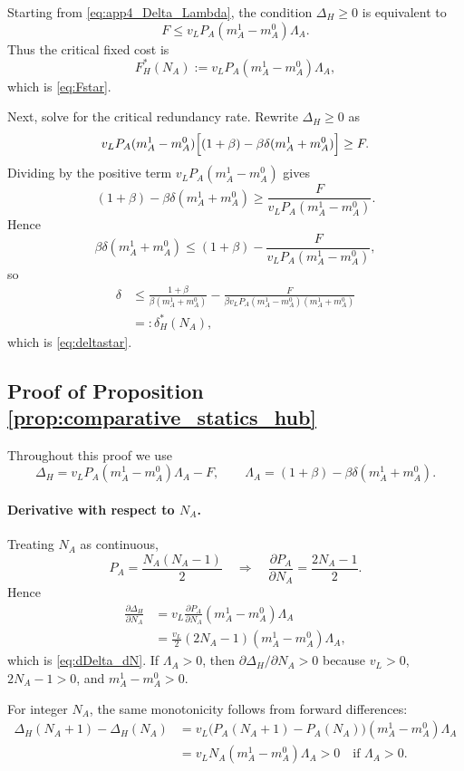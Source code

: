 Starting from \eqref{eq:app4_Delta_Lambda}, the condition $\Delta_H\ge 0$ is equivalent to
\[
F\le v_L P_A(m_A^1-m_A^0)\Lambda_A.
\]
Thus the critical fixed cost is
\begin{equation}
F_H^*(N_A):=v_L P_A(m_A^1-m_A^0)\Lambda_A,
\label{eq:app4_Fstar}
\end{equation}
which is \eqref{eq:Fstar}.

Next, solve for the critical redundancy rate. Rewrite $\Delta_H\ge 0$ as
\[
v_L P_A(m_A^1-m_A^0)\Bigl[(1+\beta)-\beta\delta(m_A^1+m_A^0)\Bigr]\ge F.
\]
Dividing by the positive term $v_L P_A(m_A^1-m_A^0)$ gives
\[
(1+\beta)-\beta\delta(m_A^1+m_A^0)
\ge
\frac{F}{v_L P_A(m_A^1-m_A^0)}.
\]
Hence
\[
\beta\delta(m_A^1+m_A^0)
\le
(1+\beta)-\frac{F}{v_L P_A(m_A^1-m_A^0)},
\]
so
\begin{align}
\delta
&\le
\frac{1+\beta}{\beta(m_A^1+m_A^0)}
-
\frac{F}{\beta v_L P_A(m_A^1-m_A^0)(m_A^1+m_A^0)}
\nonumber\\
&=:\delta_H^*(N_A),
\label{eq:app4_deltastar}
\end{align}
which is \eqref{eq:deltastar}.

\subsection{Proof of Proposition \ref{prop:comparative_statics_hub}}

Throughout this proof we use
\[
\Delta_H=v_L P_A(m_A^1-m_A^0)\Lambda_A-F,
\qquad
\Lambda_A=(1+\beta)-\beta\delta(m_A^1+m_A^0).
\]

\paragraph{Derivative with respect to $N_A$.}
Treating $N_A$ as continuous,
\[
P_A=\frac{N_A(N_A-1)}{2}
\quad\Rightarrow\quad
\frac{\partial P_A}{\partial N_A}=\frac{2N_A-1}{2}.
\]
Hence
\begin{align}
\frac{\partial \Delta_H}{\partial N_A}
&=
v_L\frac{\partial P_A}{\partial N_A}(m_A^1-m_A^0)\Lambda_A
\nonumber\\
&=
\frac{v_L}{2}(2N_A-1)(m_A^1-m_A^0)\Lambda_A,
\label{eq:app4_dDelta_dNA}
\end{align}
which is \eqref{eq:dDelta_dN}. If $\Lambda_A>0$, then $\partial\Delta_H/\partial N_A>0$ because $v_L>0$, $2N_A-1>0$, and $m_A^1-m_A^0>0$.

For integer $N_A$, the same monotonicity follows from forward differences:
\begin{align}
\Delta_H(N_A+1)-\Delta_H(N_A)
&=
v_L\bigl(P_A(N_A+1)-P_A(N_A)\bigr)(m_A^1-m_A^0)\Lambda_A
\nonumber\\
&=
v_LN_A(m_A^1-m_A^0)\Lambda_A
>0
\quad\text{if }\Lambda_A>0.
\label{eq:app4_forward_difference}
\end{align}

